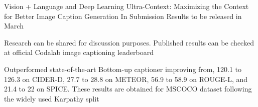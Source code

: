 \vspace*{0.08in}
\begin{cventries}
  \cventry
    {Vision + Language and Deep Learning} %
    {Ultra-Context: Maximizing the Context for Better Image Caption Generation} %
    {In Submission} %
    {Results to be released in March} %
    {
      \begin{cvitems} %
        \item {Research can be shared for discussion purposes. Published results can be checked at official Codalab image captioning leaderboard}
        \item {Outperformed state-of-the-art Bottom-up captioner improving from, 120.1 to 126.3 on CIDER-D, 27.7 to 28.8 on METEOR,  56.9 to 58.9 on ROUGE-L, and 21.4 to 22 on SPICE. These results are obtained for MSCOCO dataset following the widely used Karpathy split}    
      \end{cvitems} 
    }
\end{cventries}
